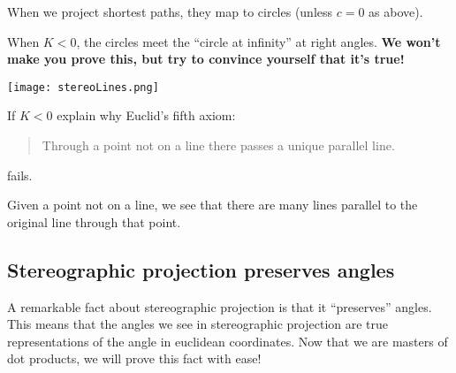 \documentclass[newpage,hints,handout]{ximera}
\begin{document}
When we project shortest paths, they map to circles (unless $c=0$ as above).

When $K<0$, the circles meet the ``circle at infinity'' at right angles.
\textbf{We won't make you prove this, but try to convince yourself that it's true!}


\begin{image}
\texttt{[image: stereoLines.png]}
\end{image}

\begin{problem}
  If $K<0$ explain why Euclid's fifth axiom:
  \begin{quote}
    Through a point not on a line there passes a unique parallel line.
  \end{quote}
  fails.
  \begin{freeResponse}
    Given a point not on a line, we see that there are many lines
    parallel to the original line through that point.
  \end{freeResponse}
\end{problem}







\subsection{Stereographic projection preserves angles}


A remarkable fact about stereographic projection is that it
``preserves'' angles. This means that the angles we see in
stereographic projection are true representations of the angle in
euclidean coordinates.  Now that we are masters of dot products, we
will prove this fact with ease!
\end{document}
